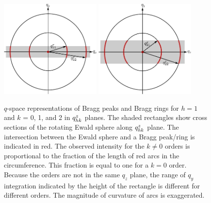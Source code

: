 \begin{figure}[htbp]
  \centering
  \includegraphics[width=0.45\textwidth]{figures/ripple/ewald_side_h1_ver1}
  \includegraphics[width=0.45\textwidth]{figures/ripple/ewald_side_h2_ver1}
  \caption{$q$-space representations of Bragg peaks and Bragg rings 
  for $h=1$ and $k$ = 0, 1, and 2 in $q_{hk}^z$ planes.
  The shaded rectangles show cross sections of the rotating Ewald sphere along
  $q_{hk}^z$ plane. The intersection between the Ewald sphere and 
  a Bragg peak/ring is indicated in red. 
  The observed intensity for the $k\neq 0$ orders is proportional to
  the fraction of the length of red arcs in the circumference. This 
  fraction is equal to one for a $k=0$ order.
  Because the orders are not in the same $q_z$ plane, the range of $q_y$ 
  integration indicated by the height of the rectangle is different for different
  orders. The magnitude of curvature of arcs is exaggerated.}
  \label{fig:ewald_side}
\end{figure}

